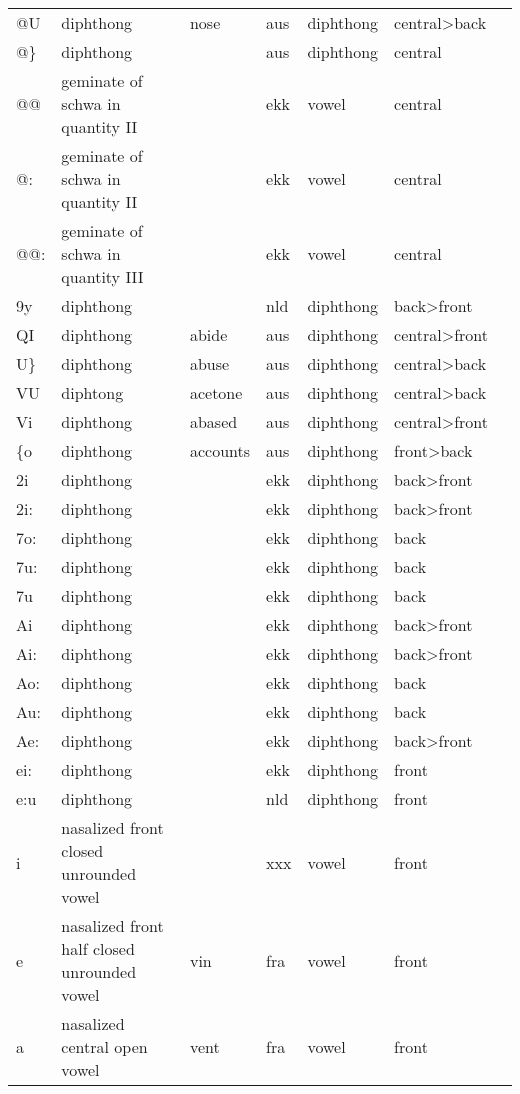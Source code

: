 \begin{longtable}{l|p{.3\linewidth}|p{.15\linewidth}|l|l|l|l}
	@U	& diphthong	& nose	& aus	& diphthong	& central\textgreater back	\\
	@\}	& diphthong	& 	& aus	& diphthong	& central	\\
	@@	& geminate of schwa in quantity II	& 	& ekk	& vowel	& central	\\
	@:	& geminate of schwa in quantity II	& 	& ekk	& vowel	& central	\\
	@@:	& geminate of schwa in quantity III	& 	& ekk	& vowel	& central	\\
	9y	& diphthong	& 	& nld	& diphthong	& back\textgreater front	\\
	QI	& diphthong	& abide	& aus	& diphthong	& central\textgreater front	\\
	U\}	& diphthong	& abuse	& aus	& diphthong	& central\textgreater back	\\
	VU	& diphtong	& acetone	& aus	& diphthong	& central\textgreater back	\\
	Vi	& diphthong	& abased	& aus	& diphthong	& central\textgreater front	\\
	\{o	& diphthong	& accounts	& aus	& diphthong	& front\textgreater back	\\
	2i	& diphthong	& 	& ekk	& diphthong	& back\textgreater front	\\
	2i:	& diphthong	& 	& ekk	& diphthong	& back\textgreater front	\\
	7o:	& diphthong	& 	& ekk	& diphthong	& back	\\
	7u:	& diphthong	& 	& ekk	& diphthong	& back	\\
	7u	& diphthong	& 	& ekk	& diphthong	& back	\\
	Ai	& diphthong	& 	& ekk	& diphthong	& back\textgreater front	\\
	Ai:	& diphthong	& 	& ekk	& diphthong	& back\textgreater front	\\
	Ao:	& diphthong	& 	& ekk	& diphthong	& back	\\
	Au:	& diphthong	& 	& ekk	& diphthong	& back	\\
	Ae:	& diphthong	& 	& ekk	& diphthong	& back\textgreater front	\\
	ei:	& diphthong	& 	& ekk	& diphthong	& front	\\
	e:u	& diphthong	& 	& nld	& diphthong	& front	\\
	i~	& nasalized front closed unrounded vowel	& 	& xxx	& vowel	& front	\\
	e~	& nasalized front half closed unrounded vowel	& vin	& fra	& vowel	& front	\\
	a~	& nasalized central open vowel	& vent	& fra	& vowel	& front	\\

\end{longtable}
